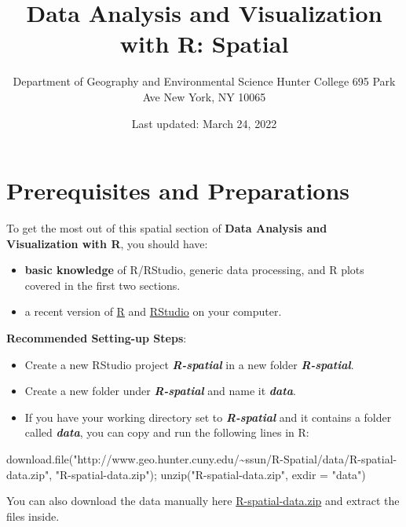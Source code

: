\documentclass[
  11pt,
]{book}
\title{Data Analysis and Visualization with R: Spatial}
\author{Department of Geography and Environmental Science Hunter College 695 Park Ave New York, NY 10065}
\date{Last updated: March 24, 2022}
\newenvironment{Shaded}{\begin{snugshade}}{\end{snugshade}}
\newcommand{\AttributeTok}[1]{\textcolor[rgb]{0.77,0.63,0.00}{#1}}
\newcommand{\FunctionTok}[1]{\textcolor[rgb]{0.00,0.00,0.00}{#1}}
\newcommand{\NormalTok}[1]{#1}
\newcommand{\StringTok}[1]{\textcolor[rgb]{0.31,0.60,0.02}{#1}}
\providecommand{\tightlist}{%
  \setlength{\itemsep}{0pt}\setlength{\parskip}{0pt}}
\begin{document}
\maketitle

{
\setcounter{tocdepth}{2}
\tableofcontents
}
\hypertarget{prerequisites-and-preparations}{%
\chapter*{Prerequisites and Preparations}\label{prerequisites-and-preparations}}


To get the most out of this spatial section of \textbf{Data Analysis and Visualization with R}, you should have:

\begin{itemize}
\tightlist
\item
  \textbf{basic knowledge} of R/RStudio, generic data processing, and R plots covered in the first two sections.
\item
  a recent version of \href{https://cran.r-project.org/}{R} and \href{https://www.rstudio.com/}{RStudio} on your computer.
\end{itemize}

\textbf{Recommended Setting-up Steps}:

\begin{itemize}
\item
  Create a new RStudio project \textbf{\emph{R-spatial}} in a new folder \textbf{\emph{R-spatial}}.
\item
  Create a new folder under \textbf{\emph{R-spatial}} and name it \textbf{\emph{data}}.
\item
  If you have your working directory set to \textbf{\emph{R-spatial}} and it contains a folder called \textbf{\emph{data}}, you can copy and run the following lines in R:
\end{itemize}

\begin{Shaded}
\begin{Highlighting}[]
\FunctionTok{download.file}\NormalTok{(}\StringTok{"http://www.geo.hunter.cuny.edu/\textasciitilde{}ssun/R{-}Spatial/data/R{-}spatial{-}data.zip"}\NormalTok{,}
              \StringTok{"R{-}spatial{-}data.zip"}\NormalTok{);}
\FunctionTok{unzip}\NormalTok{(}\StringTok{"R{-}spatial{-}data.zip"}\NormalTok{, }\AttributeTok{exdir =} \StringTok{"data"}\NormalTok{)}
\end{Highlighting}
\end{Shaded}

You can also download the data manually here \href{https://github.com/cengel/R-spatial/raw/master/data/R-spatial-data.zip}{R-spatial-data.zip} and extract the files inside.
\end{document}
